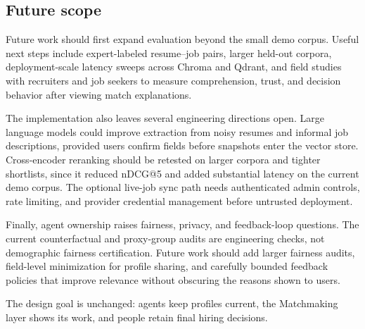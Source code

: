 \subsection{Future scope}\label{sec:7-future}

Future work should first expand evaluation beyond the small demo corpus.
Useful next steps include expert-labeled resume--job pairs, larger held-out corpora, deployment-scale latency sweeps across Chroma and Qdrant, and field studies with recruiters and job seekers to measure comprehension, trust, and decision behavior after viewing match explanations.

The implementation also leaves several engineering directions open.
Large language models could improve extraction from noisy resumes and informal job descriptions, provided users confirm fields before snapshots enter the vector store.
Cross-encoder reranking should be retested on larger corpora and tighter shortlists, since it reduced nDCG@5 and added substantial latency on the current demo corpus.
The optional live-job sync path needs authenticated admin controls, rate limiting, and provider credential management before untrusted deployment.

Finally, agent ownership raises fairness, privacy, and feedback-loop questions.
The current counterfactual and proxy-group audits are engineering checks, not demographic fairness certification.
Future work should add larger fairness audits, field-level minimization for profile sharing, and carefully bounded feedback policies that improve relevance without obscuring the reasons shown to users.

The design goal is unchanged: agents keep profiles current, the Matchmaking layer shows its work, and people retain final hiring decisions.
